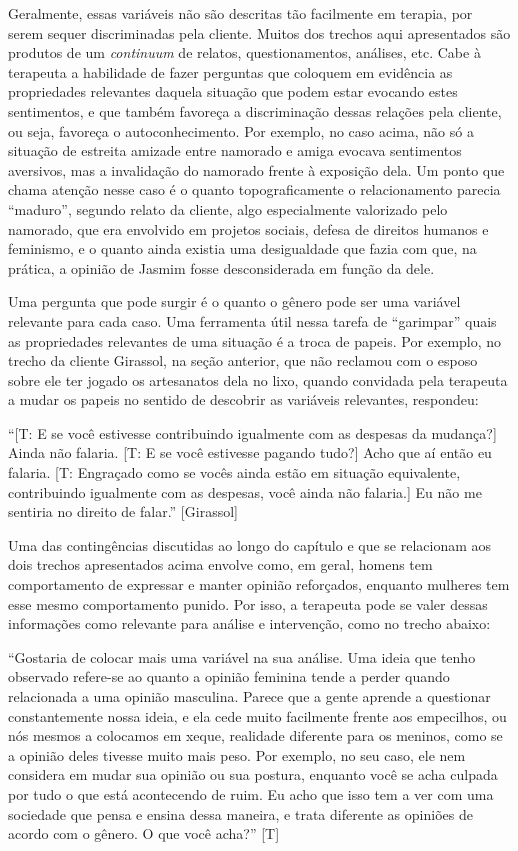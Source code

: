 Geralmente, essas variáveis não são descritas tão facilmente em terapia, por serem sequer discriminadas pela cliente. Muitos dos trechos aqui apresentados são produtos de um \textit{continuum} de relatos, questionamentos, análises, etc. Cabe à terapeuta a habilidade de fazer perguntas que coloquem em evidência as propriedades relevantes daquela situação que podem estar evocando estes sentimentos, e que também favoreça a discriminação dessas relações pela cliente, ou seja, favoreça o autoconhecimento. Por exemplo, no caso acima, não só a situação de estreita amizade entre namorado e amiga evocava sentimentos aversivos, mas a invalidação do namorado frente à exposição dela. Um ponto que chama atenção nesse caso é o quanto topograficamente o relacionamento parecia ``maduro'', segundo relato da cliente, algo especialmente valorizado pelo namorado, que era envolvido em projetos sociais, defesa de direitos humanos e feminismo, e o quanto ainda existia uma desigualdade que fazia com que, na prática, a opinião de Jasmim fosse desconsiderada em função da dele. 

Uma pergunta que pode surgir é o quanto o gênero pode ser uma variável relevante para cada caso. Uma ferramenta útil nessa tarefa de ``garimpar'' quais as propriedades relevantes de uma situação é a troca de papeis. Por exemplo, no trecho da cliente Girassol, na seção anterior, que não reclamou com o esposo sobre ele ter jogado os artesanatos dela no lixo, quando convidada pela terapeuta a mudar os papeis no sentido de descobrir as variáveis relevantes, respondeu:

``[T: E se você estivesse contribuindo igualmente com as despesas da mudança?] Ainda não falaria. [T: E se você estivesse pagando tudo?] Acho que aí então eu falaria. [T: Engraçado como se vocês ainda estão em situação equivalente, contribuindo igualmente com as despesas, você ainda não falaria.] Eu não me sentiria no direito de falar.'' [Girassol]

Uma das contingências discutidas ao longo do capítulo e que se relacionam aos dois trechos apresentados acima envolve como, em geral, homens tem comportamento de expressar e manter opinião reforçados, enquanto mulheres tem esse mesmo comportamento punido. Por isso, a terapeuta pode se valer dessas informações como relevante para análise e intervenção, como no trecho abaixo:

``Gostaria de colocar mais uma variável na sua análise. Uma ideia que tenho observado refere-se ao quanto a opinião feminina tende a perder quando relacionada a uma opinião masculina. Parece que a gente aprende a questionar constantemente nossa ideia, e ela cede muito facilmente frente aos empecilhos, ou nós mesmos a colocamos em xeque, realidade diferente para os meninos, como se a opinião deles tivesse muito mais peso. Por exemplo, no seu caso, ele nem considera em mudar sua opinião ou sua postura, enquanto você se acha culpada por tudo o que está acontecendo de ruim. Eu acho que isso tem a ver com uma sociedade que pensa e ensina dessa maneira, e trata diferente as opiniões de acordo com o gênero. O que você acha?'' [T]

